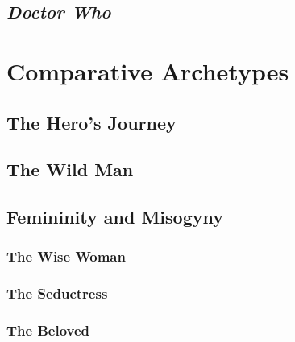 \documentclass[10pt,a4paper]{article}
\begin{document}
\subsection{\emph{Doctor Who}}
%
%
%

\section{Comparative Archetypes}
\subsection{The Hero's Journey}
%
%

\subsection{The Wild Man}
%
%

\subsection{Femininity and Misogyny}
\subsubsection{The Wise Woman}
%
%

\subsubsection{The Seductress}
%
%

\subsubsection{The Beloved}
%
%
\end{document}

